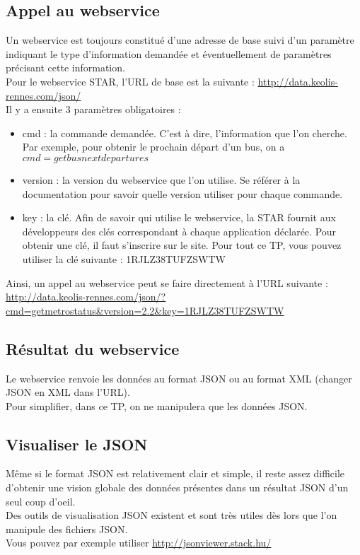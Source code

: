 \documentclass{article}
\begin{document}
\subsection{Appel au webservice}
Un webservice est toujours constitué d'une adresse de base suivi d'un paramètre
indiquant le type d'information demandée et éventuellement de paramètres
précisant cette information.\\
Pour le webservice STAR, l'URL de base est la suivante : 
\href{http://data.keolis-rennes.com/json/}{http://data.keolis-rennes.com/json/}\\
Il y a ensuite 3 paramètres obligatoires :
\begin{itemize}
  \item cmd : la commande demandée. C'est à dire, l'information que l'on
  cherche. Par exemple, pour obtenir le prochain départ d'un bus, on a
  $cmd=getbusnextdepartures$
  \item version : la version du webservice que l'on utilise. Se référer à la
  documentation pour savoir quelle version utiliser pour chaque commande. 
  \item key : la clé. Afin de savoir qui utilise le webservice, la STAR fournit
  aux développeurs des clés correspondant à chaque application déclarée. Pour
  obtenir une clé, il faut s'inscrire sur le site. Pour tout ce TP, vous pouvez
  utiliser la clé suivante : 1RJLZ38TUFZSWTW
\end{itemize}
Ainsi, un appel au webservice peut se faire directement à l'URL suivante :\\
\href{http://data.keolis-rennes.com/json/?cmd=getmetrostatus&version=2.2&key=1RJLZ38TUFZSWTW}{http://data.keolis-rennes.com/json/?cmd=getmetrostatus\&version=2.2\&key=1RJLZ38TUFZSWTW}
\subsection{Résultat du webservice}
Le webservice renvoie les données au format JSON ou au format XML (changer
JSON en XML dans l'URL).\\
Pour simplifier, dans ce TP, on ne manipulera que les données JSON.
\subsection{Visualiser le JSON} 
Même si le format JSON est relativement clair et simple, il reste assez
difficile d'obtenir une vision globale des données présentes dans un résultat JSON d'un seul coup d'oeil.\\
Des outils de visualisation JSON existent et sont très utiles dès lors que l'on
manipule des fichiers JSON.\\
Vous pouvez par exemple utiliser
\href{http://jsonviewer.stack.hu/}{http://jsonviewer.stack.hu/}
\end{document}

